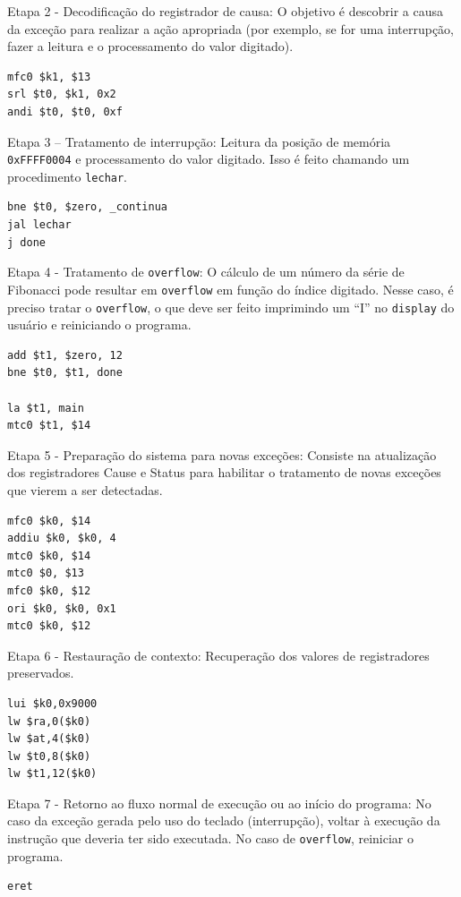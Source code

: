 \documentclass{article}
\begin{document}
Etapa 2 - Decodificação do registrador de causa: O objetivo é descobrir a causa
da exceção para realizar a ação apropriada (por exemplo, se for uma interrupção,
fazer a leitura e o processamento do valor digitado).

\begin{verbatim}
mfc0 $k1, $13
srl $t0, $k1, 0x2
andi $t0, $t0, 0xf
\end{verbatim}

Etapa 3 – Tratamento de interrupção: Leitura da posição de memória
\verb|0xFFFF0004| e processamento do valor digitado. Isso é feito chamando um
procedimento \verb|lechar|.

\begin{verbatim}
bne $t0, $zero, _continua
jal lechar
j done
\end{verbatim}

Etapa 4 - Tratamento de \verb|overflow|: O cálculo de um número da série de
Fibonacci pode resultar em \verb|overflow| em função do índice digitado. Nesse
caso, é preciso tratar o \verb|overflow|, o que deve ser feito imprimindo um “I”
no \verb|display| do usuário e reiniciando o programa.

\begin{verbatim}
add $t1, $zero, 12
bne $t0, $t1, done

la $t1, main
mtc0 $t1, $14
\end{verbatim}

Etapa 5 - Preparação do sistema para novas exceções: Consiste na atualização dos
registradores Cause e Status para habilitar o tratamento de novas exceções que
vierem a ser detectadas.

\begin{verbatim}
mfc0 $k0, $14
addiu $k0, $k0, 4
mtc0 $k0, $14
mtc0 $0, $13
mfc0 $k0, $12
ori $k0, $k0, 0x1
mtc0 $k0, $12
\end{verbatim}

Etapa 6 - Restauração de contexto: Recuperação dos valores de registradores
preservados.

\begin{verbatim}
lui $k0,0x9000
lw $ra,0($k0)
lw $at,4($k0)
lw $t0,8($k0)
lw $t1,12($k0)
\end{verbatim}

Etapa 7 - Retorno ao fluxo normal de execução ou ao início do programa: No caso
da exceção gerada pelo uso do teclado (interrupção), voltar à execução da
instrução que deveria ter sido executada. No caso de \verb|overflow|, reiniciar
o programa.

\begin{verbatim}
eret
\end{verbatim}
\end{document}
